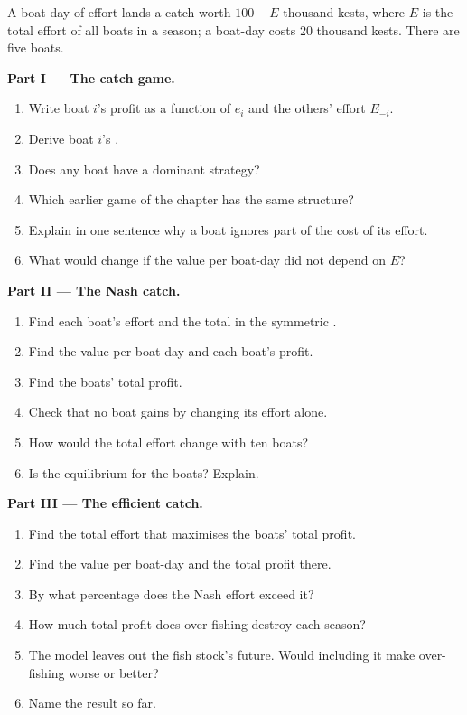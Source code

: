 \begin{problem}
\label{pb:b2:static-games:1}
A boat-day of effort lands a catch worth $100 - E$ thousand kests, where $E$ is the total effort of all boats in a
season; a boat-day costs 20 thousand kests. There are five boats.

\medskip
\noindent\textbf{Part I --- The catch game.}
\begin{enumerate}
  \item Write boat $i$'s profit as a function of $e_i$ and the others' effort $E_{-i}$.
  \item Derive boat $i$'s .
  \item Does any boat have a dominant strategy?
  \item Which earlier game of the chapter has the same structure?
  \item Explain in one sentence why a boat ignores part of the cost of its effort.
  \item What would change if the value per boat-day did not depend on $E$?
\end{enumerate}

\medskip
\noindent\textbf{Part II --- The Nash catch.}
\begin{enumerate}[resume]
  \item Find each boat's effort and the total in the symmetric .
  \item Find the value per boat-day and each boat's profit.
  \item Find the boats' total profit.
  \item Check that no boat gains by changing its effort alone.
  \item How would the total effort change with ten boats?
  \item Is the equilibrium  for the boats? Explain.
\end{enumerate}

\medskip
\noindent\textbf{Part III --- The efficient catch.}
\begin{enumerate}[resume]
  \item Find the total effort that maximises the boats' total profit.
  \item Find the value per boat-day and the total profit there.
  \item By what percentage does the Nash effort exceed it?
  \item How much total profit does over-fishing destroy each season?
  \item The model leaves out the fish stock's future. Would including it make over-fishing worse or better?
  \item Name the result so far.
\end{enumerate}


\end{problem}
